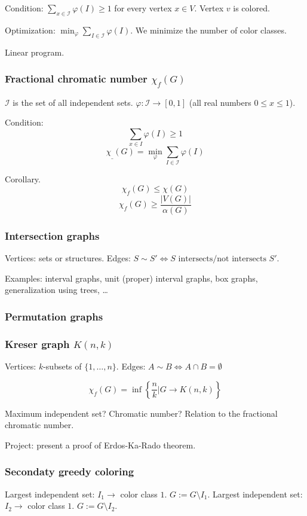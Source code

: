 \documentclass[12pt,a4paper]{article}
\begin{document}
Condition: \(\sum_{x \in \mathcal{I}} \varphi(I) \geq 1\) for every vertex \(x
\in V\).  Vertex \(v\) is colored.

Optimization: \(\min_{\varphi} \sum_{I \in \mathcal{I}} \varphi(I)\).  We
minimize the number of color classes.

Linear program.

\subsubsection{Fractional chromatic number \(\chi_f(G)\)}
\(\mathcal{I}\) is the set of all independent sets.
\(\varphi: \mathcal{I} \to [0, 1]\) (all real numbers \(0 \leq x \leq 1\)).

Condition: \[\sum_{x \in I} \varphi(I) \geq 1\]
\[\chi_{\_}(G) = \min_\varphi \sum_{I \in \mathcal{I}} \varphi(I)\]

Corollary. \[\chi_f(G) \leq \chi(G)\]
\[\chi_f(G) \geq \frac{|V(G)|}{\alpha(G)}\]

\subsubsection{Intersection graphs}
Vertices: sets or structures.
Edges: \(S \sim S' \Leftrightarrow S \text{ intersects/not intersects } S'\).

Examples: interval graphs, unit (proper) interval graphs, box graphs,
generalization using trees, …

\subsubsection{Permutation graphs}
\subsubsection{Kreser graph \(K(n, k)\)}
Vertices: \(k\)-subsets of \(\{1, \dots, n\}\).
Edges: \(A \sim B \Leftrightarrow A \cap B = \emptyset\)

\[\chi_f(G) = \inf\left\{ \frac{n}{k} |G \to K(n, k)\right\}\]

Maximum independent set? Chromatic number? Relation to the fractional chromatic
number.

Project: present a proof of Erdos-Ka-Rado theorem.

\subsubsection{Secondaty greedy coloring}
Largest independent set: \(I_1 \to\) color class \(1\).  \(G := G \setminus I_1\).
Largest independent set: \(I_2 \to\) color class \(1\).  \(G := G \setminus I_2\).
\end{document}

